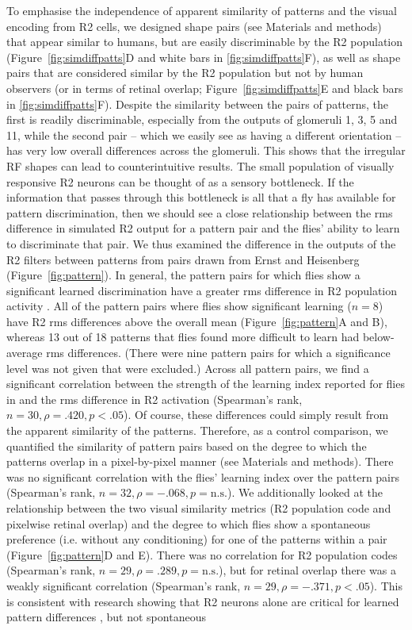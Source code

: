 To emphasise the independence of apparent similarity of patterns and the visual encoding from R2 cells, we designed shape pairs (see Materials and methods) that appear similar to humans, but are easily discriminable by the R2 population (Figure~\ref{fig:simdiffpatts}D and white bars in \ref{fig:simdiffpatts}F), as well as shape pairs that are considered similar by the R2 population but not by human observers (or in terms of retinal overlap; Figure~\ref{fig:simdiffpatts}E and black bars in \ref{fig:simdiffpatts}F). Despite the similarity between the pairs of patterns, the first is readily discriminable, especially from the outputs of glomeruli 1, 3, 5 and 11, while the second pair – which we easily see as having a different orientation – has very low overall differences across the glomeruli. This shows that the irregular \ac{RF} shapes can lead to counterintuitive results. The small population of visually responsive R2 neurons can be thought of as a sensory bottleneck. If the information that passes through this bottleneck is all that a fly has available for pattern discrimination, then we should see a close relationship between the \ac{rms} difference in simulated R2 output for a pattern pair and the flies’ ability to learn to discriminate that pair. We thus examined the difference in the outputs of the R2 filters between patterns from pairs drawn from Ernst and Heisenberg \cite{Ernst1999} (Figure~\ref{fig:pattern}). In general, the pattern pairs for which flies show a significant learned discrimination have a greater \ac{rms} difference in R2 population activity \cite{Ernst1999}. All of the pattern pairs where flies show significant learning ($n = 8$) have R2 \ac{rms} differences above the overall mean (Figure~\ref{fig:pattern}A and B), whereas 13 out of 18 patterns that flies found more difficult to learn had below-average \ac{rms} differences. (There were nine pattern pairs for which a significance level was not given that were excluded.) Across all pattern pairs, we find a significant correlation between the strength of the learning index reported for flies in \cite{Ernst1999} and the \ac{rms} difference in R2 activation (Spearman’s rank, $n = 30, \rho = .420, p < .05$). Of course, these differences could simply result from the apparent similarity of the patterns. Therefore, as a control comparison, we quantified the similarity of pattern pairs based on the degree to which the patterns overlap in a pixel-by-pixel manner (see Materials and methods). There was no significant correlation with the flies’ learning index over the pattern pairs (Spearman’s rank, $n = 32, \rho = -.068, p = \mathrm{n.s.}$). We additionally looked at the relationship between the two visual similarity metrics (R2 population code and pixelwise retinal overlap) and the degree to which flies show a spontaneous preference (i.e. without any conditioning) for one of the patterns within a pair (Figure~\ref{fig:pattern}D and E). There was no correlation for R2 population codes (Spearman's rank, $n = 29, \rho = .289, p = \mathrm{n.s.}$), but for retinal overlap there was a weakly significant correlation (Spearman's rank, $n = 29, \rho = -.371, p < .05$). This is consistent with research showing that R2 neurons alone are critical for learned pattern differences \cite{Ernst1999}, but not spontaneous 
